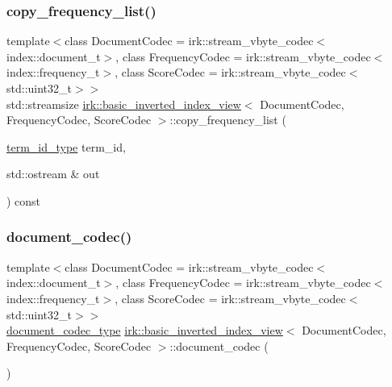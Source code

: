 \subsubsection{\texorpdfstring{copy\+\_\+frequency\+\_\+list()}{copy\_frequency\_list()}}
{\footnotesize\ttfamily template$<$class Document\+Codec  = irk\+::stream\+\_\+vbyte\+\_\+codec$<$index\+::document\+\_\+t$>$, class Frequency\+Codec  = irk\+::stream\+\_\+vbyte\+\_\+codec$<$index\+::frequency\+\_\+t$>$, class Score\+Codec  = irk\+::stream\+\_\+vbyte\+\_\+codec$<$std\+::uint32\+\_\+t$>$$>$ \\
std\+::streamsize \mbox{\hyperlink{classirk_1_1basic__inverted__index__view}{irk\+::basic\+\_\+inverted\+\_\+index\+\_\+view}}$<$ Document\+Codec, Frequency\+Codec, Score\+Codec $>$\+::copy\+\_\+frequency\+\_\+list (\begin{DoxyParamCaption}\item[{\mbox{\hyperlink{classirk_1_1basic__inverted__index__view_a6b272abc76df208ce59bac93810e7331}{term\+\_\+id\+\_\+type}}}]{term\+\_\+id,  }\item[{std\+::ostream \&}]{out }\end{DoxyParamCaption}) const\hspace{0.3cm}{\ttfamily [inline]}}

\mbox{\label{classirk_1_1basic__inverted__index__view_a52ba001bb12567d0c25f22519e194ce9}} 
\subsubsection{\texorpdfstring{document\+\_\+codec()}{document\_codec()}}
{\footnotesize\ttfamily template$<$class Document\+Codec  = irk\+::stream\+\_\+vbyte\+\_\+codec$<$index\+::document\+\_\+t$>$, class Frequency\+Codec  = irk\+::stream\+\_\+vbyte\+\_\+codec$<$index\+::frequency\+\_\+t$>$, class Score\+Codec  = irk\+::stream\+\_\+vbyte\+\_\+codec$<$std\+::uint32\+\_\+t$>$$>$ \\
\mbox{\hyperlink{classirk_1_1basic__inverted__index__view_a90415f73bd983f8a661d5502134d334f}{document\+\_\+codec\+\_\+type}} \mbox{\hyperlink{classirk_1_1basic__inverted__index__view}{irk\+::basic\+\_\+inverted\+\_\+index\+\_\+view}}$<$ Document\+Codec, Frequency\+Codec, Score\+Codec $>$\+::document\+\_\+codec (\begin{DoxyParamCaption}{ }\end{DoxyParamCaption})\hspace{0.3cm}{\ttfamily [inline]}}

